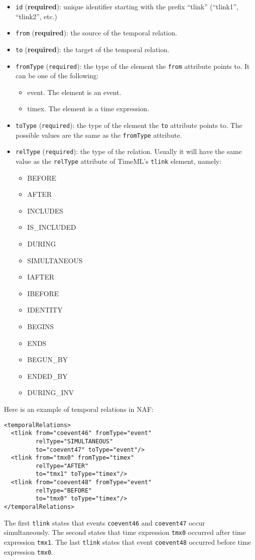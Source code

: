 \begin{itemize}
\item \texttt{id} (\textbf{required}): unique identifier starting with
  the prefix ``tlink'' (``tlink1'', ``tlink2'', etc.)
\item \texttt{from} (\textbf{required}): the source of the temporal relation.
\item \texttt{to} (\textbf{required}): the target of the temporal relation.
\item \texttt{fromType} (\texttt{required}): the type of the element the
  \texttt{from} attribute points to. It can be one of the following:
  \begin{itemize}
  \item event. The element is an event.
  \item timex. The element is a time expression.
  \end{itemize}
\item \texttt{toType} (\texttt{required}): the type of the element the
  \texttt{to} attribute points to. The possible values are the same as the
  \texttt{fromType} attribute.
\item \texttt{relType} (\texttt{required}): the type of the
  relation. Usually it will have the same value as the \texttt{relType}
  attribute of TimeML's \texttt{tlink} element, namely:
  \begin{itemize}
  \item BEFORE
  \item AFTER
  \item INCLUDES
  \item IS\_INCLUDED
  \item DURING
  \item SIMULTANEOUS
  \item IAFTER
  \item IBEFORE
  \item IDENTITY
  \item BEGINS
  \item ENDS
  \item BEGUN\_BY
  \item ENDED\_BY
  \item DURING\_INV
  \end{itemize}
\end{itemize}

Here is an example of temporal relations in NAF:
\begin{Verbatim}
<temporalRelations>
  <tlink from="coevent46" fromType="event"
         relType="SIMULTANEOUS"
         to="coevent47" toType="event"/>
  <tlink from="tmx0" fromType="timex"
         relType="AFTER"
         to="tmx1" toType="timex"/>
  <tlink from="coevent48" fromType="event"
         relType="BEFORE"
         to="tmx0" toType="timex"/>
</temporalRelations>
\end{Verbatim}

The first \texttt{tlink} states that events \texttt{coevent46} and
\texttt{coevent47} occur simultaneously. The second states that time
expression \texttt{tmx0} occurred after time expression \texttt{tmx1}. The
last \texttt{tlink} states that event \texttt{coevent48} occurred before
time expression \texttt{tmx0}.

